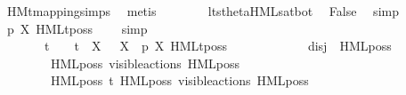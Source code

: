 \begin{isabellebody}
\ HMt{\isacharunderscore}{\kern0pt}mapping{\isachardot}{\kern0pt}simps{\isacharparenleft}{\kern0pt}{}{\isacharparenright}{\kern0pt}\ \isamarkupfalse%
\ metis\isanewline
\ \ \ \ \ \ \isamarkupfalse%
\ lts{\isacharunderscore}{\kern0pt}theta{\isachardot}{\kern0pt}HML{\isacharunderscore}{\kern0pt}sat{\isacharunderscore}{\kern0pt}bot\ \isamarkupfalse%
\ False\ \isamarkupfalse%
\ simp\isanewline
\ \ \ \ \ \ \isamarkupfalse%
\ {\isacartoucheopen}p\ {\isasymTTurnstile}{\isacharbrackleft}{\kern0pt}X{\isacharbrackright}{\kern0pt}\ HMLt{\isacharunderscore}{\kern0pt}poss\ {\isasymalpha}\ {\isasymphi}{\isacartoucheclose}\ \isamarkupfalse%
\ simp\isanewline
\ \ \ \ \isamarkupfalse%
\isanewline
\ \ \ \ \isamarkupfalse%
\ \isamarkupfalse%
\ {\isacartoucheopen}{\isasymalpha}\ {\isasymnoteq}\ {\isasymtau}\ {\isasymand}\ {\isasymalpha}\ {\isasymnoteq}\ t\ {\isasymand}\ {\isasymalpha}\ {\isasymnoteq}\ t{\isacharunderscore}{\kern0pt}{\isasymepsilon}\ {\isasymand}\ {\isacharparenleft}{\kern0pt}{\isasymforall}X{\isachardot}{\kern0pt}\ {\isasymalpha}\ {\isasymnoteq}\ {\isasymepsilon}{\isacharbrackleft}{\kern0pt}X{\isacharbrackright}{\kern0pt}{\isacharparenright}{\kern0pt}\ {\isasymLongrightarrow}\ p\ {\isasymTTurnstile}{\isacharbrackleft}{\kern0pt}X{\isacharbrackright}{\kern0pt}\ HMLt{\isacharunderscore}{\kern0pt}poss\ {\isasymalpha}\ {\isasymphi}{\isacartoucheclose}\ \isamarkupfalse%
\ {\isacharminus}{\kern0pt}\isanewline
\ \ \ \ \ \ \isamarkupfalse%
\ {\isacharquery}{\kern0pt}disj\ {\isacharequal}{\kern0pt}\ {\isacartoucheopen}{\isacharbraceleft}{\kern0pt}HML{\isacharunderscore}{\kern0pt}poss\ {\isasymalpha}\ {\isasymsigma}{\isacharparenleft}{\kern0pt}{\isasymphi}{\isacharparenright}{\kern0pt}{\isacharcomma}{\kern0pt}\ \isanewline
\ \ \ \ \ \ \ \ HML{\isacharunderscore}{\kern0pt}poss\ {\isacharparenleft}{\kern0pt}{\isasymepsilon}{\isacharbrackleft}{\kern0pt}visible{\isacharunderscore}{\kern0pt}actions{\isacharbrackright}{\kern0pt}{\isacharparenright}{\kern0pt}\ {\isacharparenleft}{\kern0pt}HML{\isacharunderscore}{\kern0pt}poss\ {\isasymalpha}\ {\isasymsigma}{\isacharparenleft}{\kern0pt}{\isasymphi}{\isacharparenright}{\kern0pt}{\isacharparenright}{\kern0pt}{\isacharcomma}{\kern0pt}\isanewline
\ \ \ \ \ \ \ \ HML{\isacharunderscore}{\kern0pt}poss\ t{\isacharunderscore}{\kern0pt}{\isasymepsilon}\ {\isacharparenleft}{\kern0pt}HML{\isacharunderscore}{\kern0pt}poss\ {\isacharparenleft}{\kern0pt}{\isasymepsilon}{\isacharbrackleft}{\kern0pt}visible{\isacharunderscore}{\kern0pt}actions{\isacharbrackright}{\kern0pt}{\isacharparenright}{\kern0pt}\ {\isacharparenleft}{\kern0pt}HML{\isacharunderscore}{\kern0pt}poss\ {\isasymalpha}\ {\isasymsigma}{\isacharparenleft}{\kern0pt}{\isasymphi}{\isacharparenright}{\kern0pt}{\isacharparenright}{\kern0pt}{\isacharparenright}{\kern0pt}{\isacharbraceright}{\kern0pt}{\isacartoucheclose}\isanewline

\end{isabellebody}
